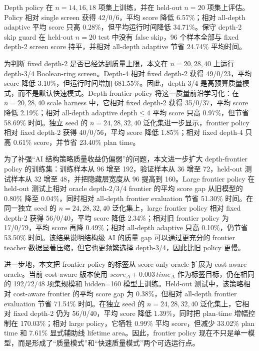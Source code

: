 \documentclass[UTF8,fontset=macnew,11pt]{ctexart}
\newcommand{\screen}{Boolean-ring screen}
\begin{document}
Depth policy 在 $n=14,16,18$ 项集上训练，并在 held-out $n=20$ 项集上评估。Policy 相对 single screen 获得 42/0/6，平均 score 降低 6.57\%；相对 all-depth adaptive 平均 score 只高 0.28\%，但平均运行时间降低 34.71\%。保守 depth-2 skip guard 在 held-out $n=20$ test 中没有 false skip，96 个样本全部与 fixed depth-2 screen score 持平，并相对 all-depth adaptive 节省 24.74\% 平均时间。

为判断 fixed depth-2 是否已经达到质量上限，本文在 $n=20,28,40$ 上运行 depth-3/4 \screen{}。Depth-4 相对 fixed depth-2 获得 49/0/23，平均 score 降低 3.10\%，但运行时间增加 681.55\%。因此，depth-3/4 是高预算质量模式，而不是默认快速模式。Depth-frontier policy 将这一质量前沿学习化：在 $n=20,28,40$ scale harness 中，它相对 fixed depth-2 获得 35/0/37，平均 score 降低 2.19\%；相对 all-depth adaptive depth$\leq4$ 平均 score 只高 0.97\%，但节省 58.69\% 时间。独立 seed 的 $n=24,28,32,40$ 泛化集进一步显示，frontier policy 相对 fixed depth-2 获得 40/0/56，平均 score 降低 1.85\%；相对 fixed depth-4 只高 0.61\% score，并节省 23.40\% plan time。

为了补强“AI 结构策略质量收益仍偏弱”的问题，本文进一步扩大 depth-frontier policy 的训练集：训练样本从 96 增至 192，验证样本从 36 增至 72，held-out 测试样本从 32 增至 48，并把隐藏层宽度从 96 提高到 160。Large frontier policy 在 held-out 测试上相对 oracle depth-2/3/4 frontier 的平均 score gap 从旧模型的 0.80\% 降至 0.04\%，同时相对 all-depth frontier evaluation 节省 51.30\% 时间。在同一独立 seed 的 $n=24,28,32,40$ 泛化集上，large frontier policy 相对 fixed depth-2 获得 56/0/40，平均 score 降低 2.34\%；相对旧 frontier policy 为 17/0/79，平均 score 再降 0.49\%；相对 all-depth adaptive 只高 0.10\%，仍节省 53.50\% 时间。该结果说明结构级 AI 的质量 gap 可以通过更充分的 frontier teacher 数据显著压缩，但它也更频繁选择 depth-3/4，因此比旧 policy 更慢。

进一步地，本文把 frontier policy 的标签从 score-only oracle 扩展为 cost-aware oracle。当前 cost-aware 版本使用 $score_{\Delta}+0.003\,time_{\Delta}$ 作为标签目标，仍在相同的 192/72/48 项集规模和 hidden=160 模型上训练。Held-out 测试中，该策略相对 cost-aware frontier 的平均 score gap 为 0.38\%，但相对 all-depth frontier evaluation 节省 71.54\% 时间。在独立 seed 的 $n=24,28,32,40$ 泛化集上，它相对 fixed depth-2 仍为 56/0/40，平均 score 降低 1.39\%，同时把 plan-time 增幅控制在 170.03\%；相对 large policy，它牺牲 0.99\% 平均 score，但减少 33.02\% plan time 和 7.61\% 显式辅助线 lifetime area。因此，frontier policy 现在不只是单一模型，而是形成了“质量模式”和“快速质量模式”两个可选运行点。
\end{document}
